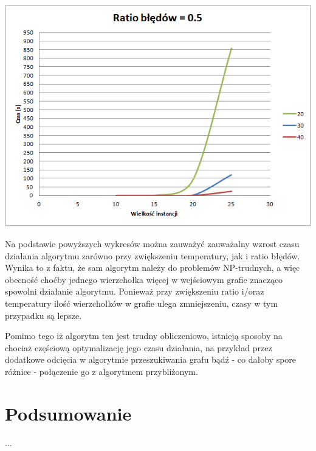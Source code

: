 \documentclass{article}
\begin{document}
\begin{center}
\includegraphics[scale=0.75]{0-5}

\end{center}

\newpage

Na podstawie powyższych wykresów można zauważyć zauważalny wzrost czasu działania algorytmu zarówno przy zwiększeniu temperatury, jak i ratio błędów. Wynika to z faktu, że sam algorytm należy do problemów NP-trudnych, a więc obecność choćby jednego wierzchołka więcej w wejściowym grafie znacząco spowolni działanie algorytmu. Ponieważ przy zwiększeniu ratio i/oraz temperatury ilość wierzchołków w grafie ulega zmniejszeniu, czasy w tym przypadku są lepsze.

Pomimo tego iż algorytm ten jest trudny obliczeniowo, istnieją sposoby na chociaż częściową optymalizację jego czasu działania, na przykład przez dodatkowe odcięcia w algorytmie przeszukiwania grafu bądź - co dałoby spore różnice - połączenie go z algorytmem przybliżonym. 

\section{Podsumowanie}

...
\end{document}
